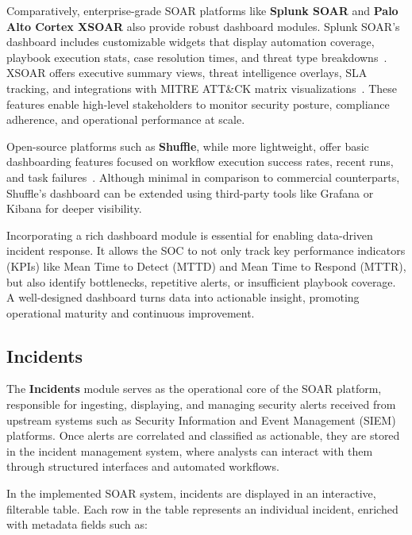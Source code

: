 Comparatively, enterprise-grade SOAR platforms like \textbf{Splunk SOAR} and \textbf{Palo Alto Cortex XSOAR} also provide robust dashboard modules. Splunk SOAR’s dashboard includes customizable widgets that display automation coverage, playbook execution stats, case resolution times, and threat type breakdowns~\cite{splunk}. XSOAR offers executive summary views, threat intelligence overlays, SLA tracking, and integrations with MITRE ATT\&CK matrix visualizations~\cite{paloalto}. These features enable high-level stakeholders to monitor security posture, compliance adherence, and operational performance at scale.

Open-source platforms such as \textbf{Shuffle}, while more lightweight, offer basic dashboarding features focused on workflow execution success rates, recent runs, and task failures~\cite{techtarget}. Although minimal in comparison to commercial counterparts, Shuffle’s dashboard can be extended using third-party tools like Grafana or Kibana for deeper visibility.

Incorporating a rich dashboard module is essential for enabling data-driven incident response. It allows the SOC to not only track key performance indicators (KPIs) like Mean Time to Detect (MTTD) and Mean Time to Respond (MTTR), but also identify bottlenecks, repetitive alerts, or insufficient playbook coverage. A well-designed dashboard turns data into actionable insight, promoting operational maturity and continuous improvement.

\subsection{Incidents}

The \textbf{Incidents} module serves as the operational core of the SOAR platform, responsible for ingesting, displaying, and managing security alerts received from upstream systems such as Security Information and Event Management (SIEM) platforms. Once alerts are correlated and classified as actionable, they are stored in the incident management system, where analysts can interact with them through structured interfaces and automated workflows.

In the implemented SOAR system, incidents are displayed in an interactive, filterable table. Each row in the table represents an individual incident, enriched with metadata fields such as:

